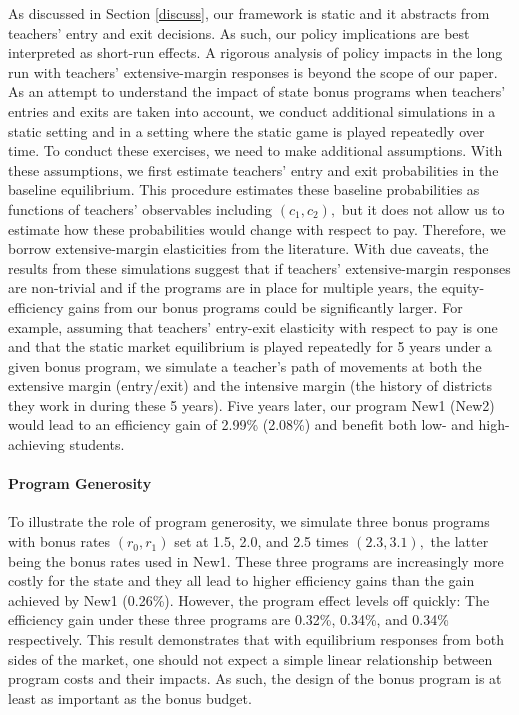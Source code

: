 \documentclass[notitlepage,12pt]{article}%
\begin{document}
As discussed in Section \ref{discuss}, our framework is static and it
abstracts from teachers' entry and exit decisions. As such, our policy
implications are best interpreted as short-run effects. A rigorous analysis of
policy impacts in the long run with teachers' extensive-margin responses is
beyond the scope of our paper. As an attempt to understand the impact of state
bonus programs when teachers' entries and exits are taken into account, we
conduct additional simulations in a static setting and in a setting where the
static game is played repeatedly over time. To conduct these exercises, we
need to make additional assumptions. With these assumptions, we first estimate
teachers' entry and exit probabilities in the baseline equilibrium. This
procedure estimates these baseline probabilities as functions of teachers'
observables including $\left(  c_{1},c_{2}\right)  ,$ but it does not allow us
to estimate how these probabilities would change with respect to pay.
Therefore, we borrow extensive-margin elasticities from the literature. With
due caveats, the results from these simulations suggest that if teachers'
extensive-margin responses are non-trivial and if the programs are in place
for multiple years, the equity-efficiency gains from our bonus programs could
be significantly larger. For example, assuming that teachers' entry-exit
elasticity with respect to pay is one and that the static market equilibrium
is played repeatedly for 5 years under a given bonus program, we simulate a
teacher's path of movements at both the extensive margin (entry/exit) and the
intensive margin (the history of districts they work in during these 5 years).
Five years later, our program New1 (New2) would lead to an efficiency gain of
2.99\% (2.08\%) and benefit both low- and high-achieving students.

\paragraph{Program Generosity}

To illustrate the role of program generosity, we simulate three bonus programs
with bonus rates $\left(  r_{0},r_{1}\right)  $ set at 1.5, 2.0, and 2.5 times
$(2.3,3.1),$ the latter being the bonus rates used in New1. These three
programs are increasingly more costly for the state and they all lead to
higher efficiency gains than the gain achieved by New1 (0.26\%). However, the
program effect levels off quickly: The efficiency gain under these three
programs are 0.32\%, 0.34\%, and 0.34\% respectively. This result demonstrates
that with equilibrium responses from both sides of the market, one should not
expect a simple linear relationship between program costs and their impacts.
As such, the design of the bonus program is at least as important as the bonus budget.
\end{document}
